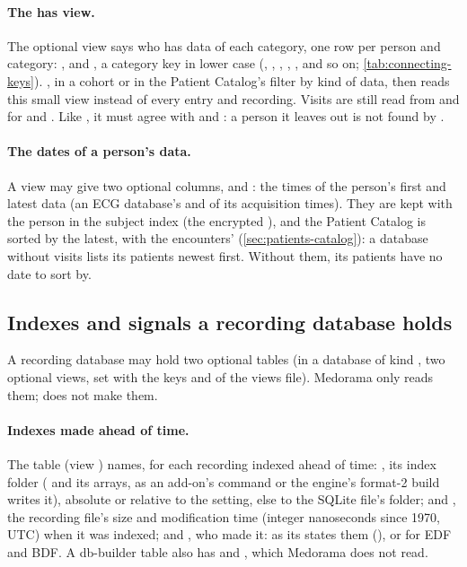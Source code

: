 \paragraph{The has view.} The optional  view says who has data of each category, one
row per person and category: , and , a category key in lower
case (, , , , ,  and so on;
\cref{tab:connecting-keys}). , in a cohort or in the Patient Catalog's filter by
kind of data, then reads this small view instead of every entry and recording. Visits are still
read from  and  for  and . Like ,
it must agree with  and : a person it leaves out is not found by
.

\paragraph{The dates of a person's data.} A  view may give two optional columns,
 and : the times of the person's first and latest data (an ECG
database's  and  of its acquisition times). They are kept with the person in
the subject index (the encrypted ), and the Patient Catalog is sorted by the
latest, with the encounters' (\cref{sec:patients-catalog}): a database without visits lists its
patients newest first. Without them, its patients have no date to sort by.

\subsection{Indexes and signals a recording database holds}
\label{sec:connecting-held}

A recording database may hold two optional tables (in a database of kind , two
optional views, set with the keys  and  of the views file). Medorama
only reads them;  does not make them.

\paragraph{Indexes made ahead of time.} The table  (view
) names, for each recording indexed ahead of time: , its index
folder ( and its arrays, as an add-on's  command or the engine's
format-2 build writes it), absolute or relative to the  setting, else to the
SQLite file's folder;  and , the recording file's size and
modification time (integer nanoseconds since 1970, UTC) when it was indexed; and
, who made it:  as its  states them
(), or  for EDF and BDF. A db-builder table
also has  and , which Medorama does not read.

